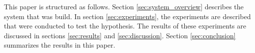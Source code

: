 \documentclass[a4paper]{article}
\begin{document}

This paper is structured as follows. Section \ref{sec:system_overview} describes the system that was build. In section \ref{sec:experiments}, the experiments are described that were conducted to test the hypothesis. The results of these experiments are discussed in sections \ref{sec:results} and \ref{sec:discussion}. Section \ref{sec:conclusion} summarizes the results in this paper.

\end{document}
